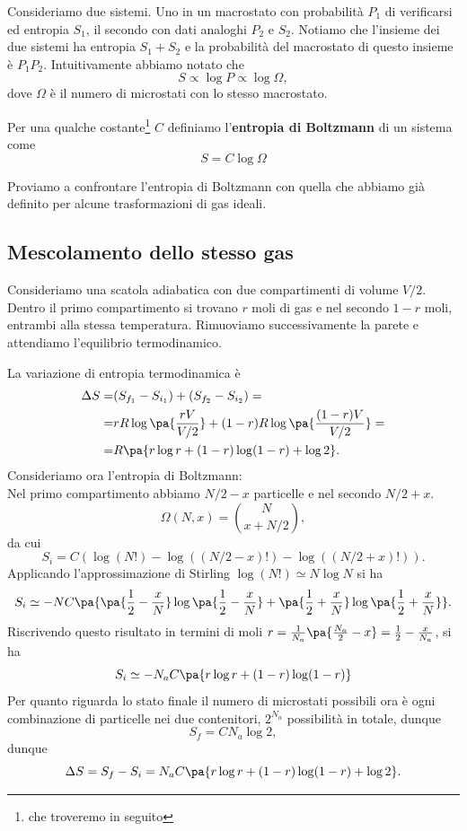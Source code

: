 \begin{remark}
Consideriamo due sistemi. Uno in un macrostato con probabilit\`a $P_1$ di verificarsi ed entropia $S_1$, il secondo con dati analoghi $P_2$ e $S_2$. Notiamo che l'insieme dei due sistemi ha entropia $S_1+S_2$ e la probabilit\`a del macrostato di questo insieme \`e $P_1P_2$. Intuitivamente abbiamo notato che
\[S\propto \log P\propto \log\Omega,\]
dove $\Omega$ \`e il numero di microstati con lo stesso macrostato.
\end{remark}

\begin{definition}
Per una qualche costante\footnote{che troveremo in seguito} $C$ definiamo l'\textbf{entropia di Boltzmann} di un sistema come
\[S=C\log\Omega\]
\end{definition}

\noindent Proviamo a confrontare l'entropia di Boltzmann con quella che abbiamo gi\`a definito per alcune trasformazioni di gas ideali.

\subsection{Mescolamento dello stesso gas}

Consideriamo una scatola adiabatica con due compartimenti di volume $V/2$. Dentro il primo compartimento si trovano $r$ moli di gas e nel secondo $1-r$ moli, entrambi alla stessa temperatura. Rimuoviamo successivamente la parete e attendiamo l'equilibrio termodinamico.
\bigskip

\noindent La variazione di entropia termodinamica \`e
\begin{align*}
\Delta S=&(S_{f_1}-S_{i_1})+(S_{f_2}-S_{i_2})=\\
=&rR\log\pa{\frac{rV}{V/2}}+(1-r)R\log\pa{\frac{(1-r)V}{V/2}}=\\
=&R\pa{r\log r+(1-r)\log(1-r)+\log 2}.
\end{align*}
\noindent
Consideriamo ora l'entropia di Boltzmann:\\
Nel primo compartimento abbiamo $N/2 -x$ particelle e nel secondo $N/2 +x$.
\[\Omega(N,x)=\binom{N}{x+N/2},\]
da cui
\[S_i=C(\log(N!)-\log((N/2-x)!)-\log((N/2+x)!)).\]
Applicando l'approssimazione di Stirling $\log(N!)\simeq N\log N$ si ha
\[S_i\simeq -NC\pa{\pa{\frac12-\frac xN}\log\pa{\frac12-\frac xN}+\pa{\frac12+\frac xN}\log\pa{\frac12+\frac xN}}.\]
Riscrivendo questo risultato in termini di moli $r=\frac1{N_a}\pa{\frac{N_a}2-x}=\frac12-\frac x{N_a}$, si ha
\[S_i\simeq -N_a C\pa{r\log r+(1-r)\log (1-r)}\]
Per quanto riguarda lo stato finale il numero di microstati possibili ora \`e ogni combinazione di particelle nei due contenitori, $2^{N_a}$ possibilit\`a in totale, dunque
\[S_f=CN_a\log 2,\]
dunque
\[\Delta S=S_f-S_i=N_aC\pa{r\log r+(1-r)\log(1-r)+\log 2}.\]
\bigskip

